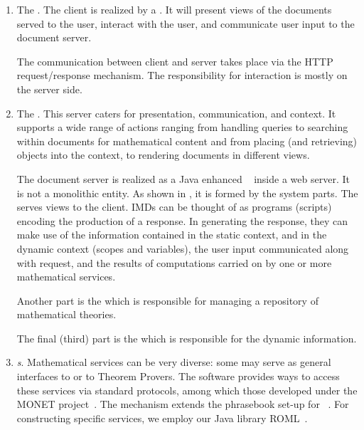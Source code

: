 \begin{enumerate}
\item The {}. The client is realized by a
  {}.  It will present views of the documents served
  to the user, interact with the user, and communicate user input to the document server.

  The communication between client and server takes place via the HTTP request/response
  mechanism.  The responsibility for interaction is mostly on the server side.
\item The {}.  This server caters for presentation,
  communication, and context.  It supports a wide range of actions ranging from handling
  queries to searching within documents for mathematical content and from placing (and
  retrieving) objects into the context, to rendering documents in different views.

  The document server is realized as a Java enhanced
  {}~\cite{URL:jsp} inside a web server.  It is not a monolithic
  entity. As shown in {}, it is formed by the system parts.  The
  {} serves views to the client.  IMDs can be thought of
  as programs (scripts) encoding the production of a response.  In generating the
  response, they can make use of the information contained in the static context, and in
  the dynamic context (scopes and variables), the user input communicated along with
  request, and the results of computations carried on by one or more mathematical
  services.
  
  Another part is the {} which is responsible
  for managing a repository of {\MathDox} mathematical theories.
  
  The final (third) part is the {} which is
  responsible for the dynamic information.

\item {\em{}s}.  Mathematical services can be very diverse:
  some may serve as general interfaces to {\CAS} or to Theorem Provers.  The {\MathDox}
  software provides ways to access these services via standard protocols, among which
  those developed under the MONET project~\cite{URL:monet}.  The mechanism extends the
  phrasebook set-up for {\openmath}~\cite{CapCoh:uosdmc00,CapCoh:jpcaad00}.  For
  constructing specific {\openmath} services, we employ our Java {\openmath} library
  ROML~\cite{URL:roml}.
\end{enumerate}

